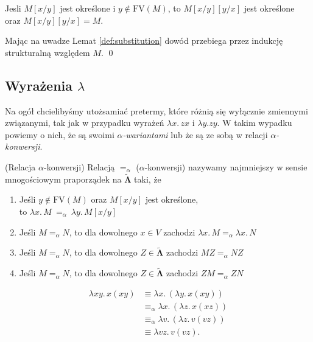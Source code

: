 \begin{wniosek}\label{thm:odwracalnosc_podstawienia}
Jesli \(M[x/y]\) jest określone i \(y\not\in\mathrm{FV}(M)\), to \(M[x/y][y/x]\) jest określone oraz
  \(M[x/y][y/x]=M\).
  \begin{dowod}
    Mając na uwadze Lemat \ref{def:substitution} dowód przebiega przez indukcję strukturalną względem \(M\).
    \qed
  \end{dowod}
\end{wniosek}



\subsection{Wyrażenia \(\lambda\)}
Na ogół chcielibyśmy utożsamiać pretermy, które różnią się wyłącznie zmiennymi związanymi, tak jak w przypadku wyrażeń \(\lambda x. \,zx\) i \(\lambda y.zy\). W takim wypadku powiemy o nich, że są swoimi \emph{\(\alpha\)-wariantami} lub że są ze sobą w relacji \emph{\(\alpha\)-konwersji}.

\begin{definicja}(Relacja \(\alpha\)-konwersji)\label{def:untyped_alpha}
  Relacją \(=_{\alpha}\) (\(\alpha\)-konwersji) nazywamy najmniejszy w sensie mnogościowym praporządek na \(\mathbf{\tilde\Lambda}\) taki, że
  \begin{enumerate}[label={(\(\alpha\)\arabic*)}, ref={(\(\alpha\)\arabic*)}]
  \setlength\itemsep{0em}
  \item Jeśli \(y\not\in \mathrm{FV}(M)\) oraz \(M[x/y]\) jest określone,\\ to \(\lambda x.\,M~=_{\alpha}~\lambda y.\,M[x/y]\)\label{def:alpha_1}
  \item Jeśli \(M=_{\alpha} N\), to dla dowolnego \(x\in V\) zachodzi \(\lambda x.\,M =_{\alpha} \lambda x.\,N\)\label{def:alpha_2}
  \item Jeśli \(M=_{\alpha} N\), to dla dowolnego \(Z\in\mathbf{\tilde\Lambda}\) zachodzi \(MZ =_{\alpha} NZ\)\label{def:alpha_3}
  \item Jeśli \(M=_{\alpha} N\), to dla dowolnego \(Z\in\mathbf{\tilde\Lambda}\) zachodzi \(ZM =_{\alpha} ZN\)\label{def:alpha_4}
  \end{enumerate}
\end{definicja}

\begin{przyklad}
  \begin{align*}
    \lambda x y.\,x(xy) &\equiv \lambda x.\,(\lambda y.\,x(xy)) \\
                        &\equiv_\alpha \lambda x.\,(\lambda z.\,x(xz)) \\
                        &\equiv_\alpha \lambda v.\,(\lambda z.\,v(vz)) \\
                        &\equiv \lambda vz.\,v(vz).
  \end{align*}

\end{przyklad}

